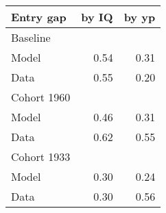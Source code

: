 \begin{tabular}{lrr}
\hline
Entry gap & by IQ  & by yp  \\ 
\hline
Baseline &   &   \\ 
Model & 0.54  & 0.31  \\ 
Data & 0.55  & 0.20  \\ 
Cohort 1960 &   &   \\ 
Model & 0.46  & 0.31  \\ 
Data & 0.62  & 0.55  \\ 
Cohort 1933 &   &   \\ 
Model & 0.30  & 0.24  \\ 
Data & 0.30  & 0.56  \\ 
\hline
\end{tabular}%

